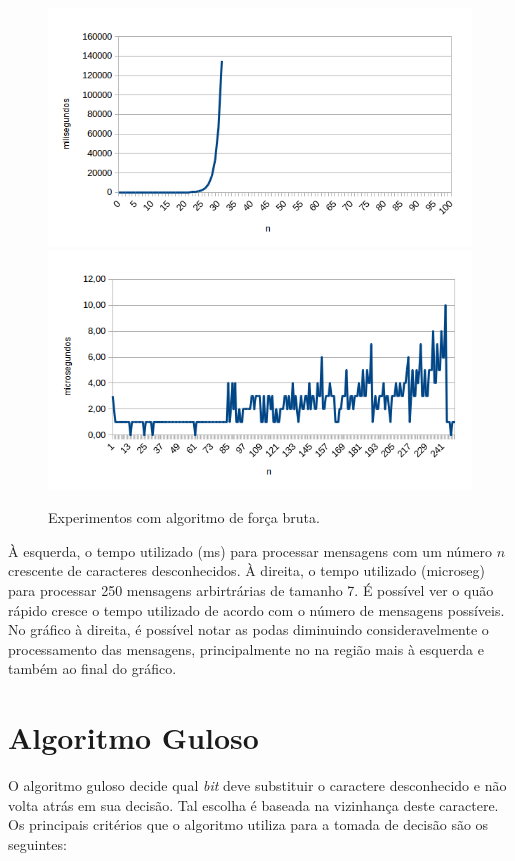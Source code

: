 \documentclass[a4paper,12pt,titlepage]{article}
\begin{document}
\begin{figure}[H]
     \centering
     \includegraphics[scale=0.48]{figures/chart-bf.png}
     \includegraphics[scale=0.48]{figures/chart-bf-all.png}
     \caption{Experimentos com algoritmo de força bruta.}
\end{figure}

À esquerda, o tempo utilizado (ms) para processar mensagens com um número $n$ crescente de caracteres desconhecidos. À direita, o tempo utilizado (microseg) para processar 250 mensagens arbirtrárias de tamanho 7. É possível ver o quão rápido cresce o tempo utilizado de acordo com o número de mensagens possíveis. No gráfico à direita, é possível notar as podas diminuindo consideravelmente o processamento das mensagens, principalmente no na região mais à esquerda e também ao final do gráfico.




\section{Algoritmo Guloso}

O algoritmo guloso decide qual \textit{bit} deve substituir o caractere desconhecido e não volta atrás em sua decisão. Tal escolha é baseada na vizinhança deste caractere. Os principais critérios que o algoritmo utiliza para a tomada de decisão são os seguintes:
\end{document}
